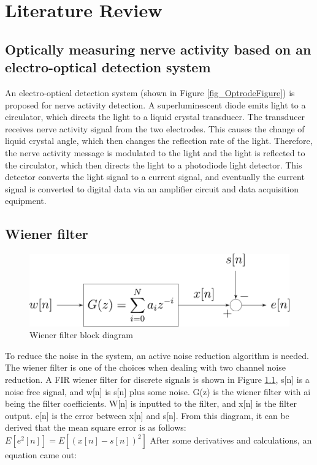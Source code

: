 \chapter{Literature Review}\label{c:literature}

\section{Optically measuring nerve activity based on an electro-optical detection system}
An electro-optical detection system \cite{OptrodeProceesings} (shown in Figure \ref{fig_OptrodeFigure}) is proposed for nerve activity detection.  A superluminescent diode emits light to a circulator, which directs the light to a liquid crystal transducer.  The transducer receives nerve activity signal from the two electrodes.  This causes the change of liquid crystal angle, which then changes the reflection rate of the light.  Therefore, the nerve activity message is modulated to the light and the light is reflected to the circulator, which then directs the light to a photodiode light detector.  This detector converts the light signal to a current signal, and eventually the current signal is converted to digital data via an amplifier circuit and data acquisition equipment.  


\section{Wiener filter}

\begin{figure}[htbp]
\centerline{\includegraphics[scale=0.5]{3-literature/Wiener_block.pdf}}
\caption{Wiener filter block diagram}
\label{fig_Wiener_block}
\end{figure}

To reduce the noise in the system, an active noise reduction algorithm is needed.  The wiener filter is one of the choices when dealing with two channel noise reduction.  A FIR wiener filter for discrete signals \cite{Wikipedia_2023} is shown in Figure \ref{fig_Wiener_block}, s[n] is a noise free signal, and w[n] is s[n] plus some noise.  G(z) is the wiener filter with ai being the filter coefficients.   W[n] is inputted to the filter, and x[n] is the filter output.  e[n] is the error between x[n] and s[n].  From this diagram, it can be derived that the mean square error is as follows:
$E[e^2 [n]]=E[(x[n]-s[n])^2 ]$
After some derivatives and calculations, an equation \cite{Wikipedia_2023} came out:



